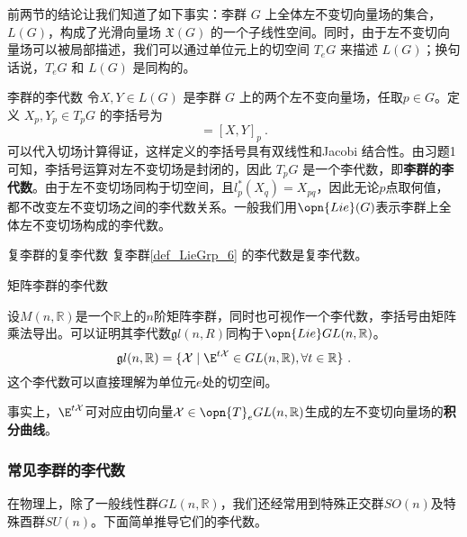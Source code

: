 前两节的结论让我们知道了如下事实：李群 $G$ 上全体左不变切向量场的集合，$L(G)$，构成了光滑向量场 $\mathfrak{X}(G)$ 的一个子线性空间。同时，由于左不变切向量场可以被局部描述，我们可以通过单位元上的切空间 $T_eG$ 来描述 $L(G)$；换句话说，$T_eG$ 和 $L(G)$ 是同构的。

\begin{definition}{李群的李代数}
令$X, Y\in L(G)$ 是李群 $G$ 上的两个左不变向量场，任取$p\in G$。定义 $X_p, Y_p\in T_pG$ 的李括号为
\begin{equation}
[X_p, Y_p]=[X, Y]_p~.
\end{equation}
可以代入切场计算得证，这样定义的李括号具有双线性和Jacobi 结合性。由习题1可知，李括号运算对左不变切场是封闭的，因此 $T_p G$ 是一个李代数，即\textbf{李群的李代数}。由于左不变切场同构于切空间，且$l_p^*(X_q)=X_{pq}$，因此无论$p$点取何值，都不改变左不变切场之间的李代数关系。一般我们用$\opn{Lie}(G)$表示李群上全体左不变切场构成的李代数。
\end{definition}




\begin{theorem}{复李群的复李代数}
复李群\autoref{def_LieGrp_6} 的李代数是复李代数。
\end{theorem}



\begin{example}{矩阵李群的李代数}

设$M(n,\mathbb R)$是一个$\mathbb{R}$上的$n$阶矩阵李群，同时也可视作一个李代数，李括号由矩阵乘法导出。可以证明其李代数$\mathfrak gl(n,R)$同构于$\opn{Lie}GL(n,\mathbb R)$。
\begin{equation}\label{eq_LieGA_3}
\mathfrak gl(n,\mathbb R) = \{ \mathcal{X} \mid \E^{t\mathcal{X}}\in GL(n,\mathbb R), \forall t\in\mathbb{R} \}~.
\end{equation}
这个李代数可以直接理解为单位元$e$处的切空间。

事实上，$\E^{t\mathcal{X}}$可对应由切向量$\mathcal{X}\in\opn{T}_e GL(n,\mathbb R)$生成的左不变切向量场的\textbf{积分曲线}。

\end{example}
\subsubsection{常见李群的李代数}%
在物理上，除了一般线性群$GL(n,\mathbb R)$，我们还经常用到特殊正交群$SO(n)$及特殊酉群$SU(n)$。下面简单推导它们的李代数。

